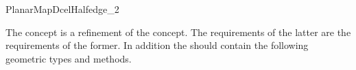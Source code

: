 
\ccRefPageBegin


\begin{ccRefConcept}{PlanarMapDcelHalfedge_2}

The \ccRefName concept is a refinement of the  concept. 
The requirements of the latter are the requirements of the former.
In addition the \ccRefName should contain the  following geometric types and methods.

\ccTypes
{}

  \ccOperations
  

\end{ccRefConcept} %

\ccRefPageEnd
